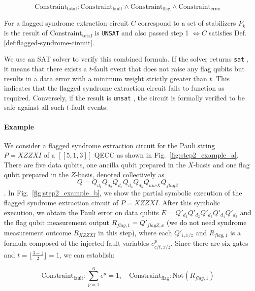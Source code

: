 \documentclass[acmsmallw,review]{acmart}
\begin{document}
\begin{equation}
\mathrm{Constraint}_{\mathrm{total}} : \mathrm{Constraint}_{\mathrm{fault}} \land \mathrm{Constraint}_{\mathrm{flag}} \land \mathrm{Constraint}_{\mathrm{error}}
\end{equation}


\begin{lemma}
    For a  flagged syndrome extraction circuit $C$ correspond to a set of stabilizers ${P_k}$ is the result of $\mathrm{Constraint}_{\mathrm{total}}$ is \texttt{UNSAT} and also passed step 1 $\Leftrightarrow C$ satisfies Def. \ref{def:flagged-syndrome-circuit}.
\end{lemma}
We use an SAT solver to verify this combined formula. If the solver returns \texttt{sat} , it means that there exists a $t$-fault event that does not raise any flag qubits but results in a data error with a minimum weight strictly greater than $t$. This indicates that the flagged syndrome extraction circuit fails to function as required. Conversely, if the result is \texttt{unsat} , the circuit is formally verified to be safe against all such $t$-fault events.



\paragraph{\textbf{Example}}
We consider a flagged syndrome extraction circuit for the Pauli string $P = XZZXI$ of a $[[5,1,3]]$ QECC as shown in Fig.~\ref{fig:step2_example_a}. There are five data qubits, one ancilla qubit prepared in the $X$-basis and one flag qubit prepared in the $Z$-basis, denoted collectively as $$Q = Q_{d_1} Q_{d_2} Q_{d_3}Q_{d_4} Q_{d_5} Q_{ancX} Q_{flagZ}$$. In Fig.~\ref{fig:step2_example_b}, we show the partial symbolic execution of the flagged syndrome extraction circuit of $P=XZZXI$. After this symbolic execution, we obtain the Pauli error on data qubits  $E = Q'_{d_1} Q'_{d_2}Q'_{d_3}Q'_{d_4}Q'_{d_5}$ and the flag qubit measurement output $R_{flag,1} = Q'_{flagZ, x}$ (we do not need syndrome measurement outcome $R_{XZZXI}$ in this step), where each $Q'_{i,x/z}$ and $R_{flag,1} $ is a formula composed of the injected fault variables $e^{p}_{c/t, x/z}$. Since there are six gates and $t = \lfloor \frac{3-1}{2} \rfloor = 1$, we can establish:

\begin{equation}
\mathrm{Constraint}_{\mathrm{fault}} : \sum_{p=1}^{6} e^{p}= 1 , \quad \mathrm{Constraint}_{\mathrm{flag}}: \mathrm{Not}(R_{flag,1})
\end{equation}
\end{document}
